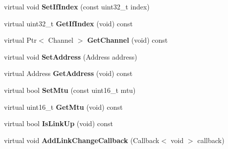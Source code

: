 \begin{DoxyCompactItemize}
\item 
\hypertarget{classns3_1_1PLC__NetDevice_ad53fdd96eca2e68e86c677647d645b3d}{virtual void {\bfseries \-Set\-If\-Index} (const uint32\-\_\-t index)}\label{classns3_1_1PLC__NetDevice_ad53fdd96eca2e68e86c677647d645b3d}

\item 
\hypertarget{classns3_1_1PLC__NetDevice_a48b82babf1b68b0e2e4bb5ae4da25fb7}{virtual uint32\-\_\-t {\bfseries \-Get\-If\-Index} (void) const }\label{classns3_1_1PLC__NetDevice_a48b82babf1b68b0e2e4bb5ae4da25fb7}

\item 
\hypertarget{classns3_1_1PLC__NetDevice_a2efb94ed1cdabe913b15c073ce0da98b}{virtual \-Ptr$<$ \-Channel $>$ {\bfseries \-Get\-Channel} (void) const }\label{classns3_1_1PLC__NetDevice_a2efb94ed1cdabe913b15c073ce0da98b}

\item 
\hypertarget{classns3_1_1PLC__NetDevice_a5fd512619a928b3e59032110825cd0a9}{virtual void {\bfseries \-Set\-Address} (\-Address address)}\label{classns3_1_1PLC__NetDevice_a5fd512619a928b3e59032110825cd0a9}

\item 
\hypertarget{classns3_1_1PLC__NetDevice_a45c0c25be90bf51b2b6aa491fe88523c}{virtual \-Address {\bfseries \-Get\-Address} (void) const }\label{classns3_1_1PLC__NetDevice_a45c0c25be90bf51b2b6aa491fe88523c}

\item 
\hypertarget{classns3_1_1PLC__NetDevice_a492f4dfa85a3a4a1a80a54220c41c493}{virtual bool {\bfseries \-Set\-Mtu} (const uint16\-\_\-t mtu)}\label{classns3_1_1PLC__NetDevice_a492f4dfa85a3a4a1a80a54220c41c493}

\item 
\hypertarget{classns3_1_1PLC__NetDevice_afbde7c16392320bfa5d6eef133064ad2}{virtual uint16\-\_\-t {\bfseries \-Get\-Mtu} (void) const }\label{classns3_1_1PLC__NetDevice_afbde7c16392320bfa5d6eef133064ad2}

\item 
\hypertarget{classns3_1_1PLC__NetDevice_adcb78aebb74e738fd01acb1157f02d6f}{virtual bool {\bfseries \-Is\-Link\-Up} (void) const }\label{classns3_1_1PLC__NetDevice_adcb78aebb74e738fd01acb1157f02d6f}

\item 
\hypertarget{classns3_1_1PLC__NetDevice_aff8a63309668ab0508e99a9ad7012fbb}{virtual void {\bfseries \-Add\-Link\-Change\-Callback} (\-Callback$<$ void $>$ callback)}\label{classns3_1_1PLC__NetDevice_aff8a63309668ab0508e99a9ad7012fbb}


\end{DoxyCompactItemize}
